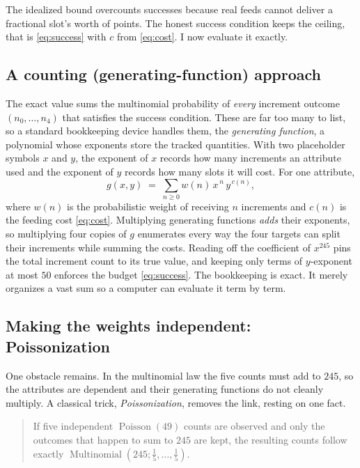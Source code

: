 \documentclass[11pt]{article}
\theoremstyle{remark}
\newcommand{\Mult}{\operatorname{Multinomial}}
\newcommand{\Pois}{\operatorname{Poisson}}
\begin{document}
The idealized bound overcounts successes because real feeds cannot deliver a
fractional slot's worth of points. The honest success condition keeps the ceiling,
that is \eqref{eq:success} with $c$ from \eqref{eq:cost}. I now evaluate it exactly.

\subsection{A counting (generating-function) approach}
The exact value sums the multinomial probability of \emph{every} increment outcome
$(n_0,\dots,n_4)$ that satisfies the success condition. These are far too many to
list, so a standard bookkeeping device handles them, the \emph{generating function}, a
polynomial whose exponents store the tracked quantities. With two placeholder
symbols $x$ and $y$,
the exponent of $x$ records how many increments an attribute used and the exponent of
$y$ records how many slots it will cost. For one attribute,
\begin{equation}\label{eq:gf}
   g(x,y)\;=\;\sum_{n\ge 0} w(n)\,x^{\,n}\,y^{\,c(n)},
\end{equation}
where $w(n)$ is the probabilistic weight of receiving $n$ increments and $c(n)$ is
the feeding cost \eqref{eq:cost}. Multiplying generating functions \emph{adds} their
exponents, so multiplying four copies of $g$ enumerates every way the four targets
can split their increments while summing the costs. Reading off the coefficient of
$x^{245}$ pins the total increment count to its true value, and keeping only terms of
$y$-exponent at most $50$ enforces the budget \eqref{eq:success}. The bookkeeping is
exact. It merely organizes a vast sum so a computer can evaluate it term by term.

\subsection{Making the weights independent: Poissonization}
One obstacle remains. In the multinomial law the five counts must add to $245$, so the
attributes are dependent and their generating functions do not cleanly multiply. A
classical trick, \emph{Poissonization}, removes the link, resting on one fact.

\begin{quote}
If five independent $\Pois(49)$ counts are observed and only the outcomes that
happen to sum to $245$ are kept, the resulting counts follow exactly
$\Mult(245;\tfrac15,\dots,\tfrac15)$.
\end{quote}
\end{document}

